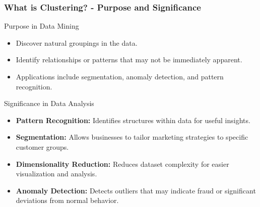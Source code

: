 \documentclass[aspectratio=169]{beamer}
\begin{document}
\begin{frame}[fragile]
    \frametitle{What is Clustering? - Purpose and Significance}
    \begin{block}{Purpose in Data Mining}
        \begin{itemize}
            \item Discover natural groupings in the data.
            \item Identify relationships or patterns that may not be immediately apparent.
            \item Applications include segmentation, anomaly detection, and pattern recognition.
        \end{itemize}
    \end{block}

    \begin{block}{Significance in Data Analysis}
        \begin{itemize}
            \item \textbf{Pattern Recognition:} Identifies structures within data for useful insights.
            \item \textbf{Segmentation:} Allows businesses to tailor marketing strategies to specific customer groups.
            \item \textbf{Dimensionality Reduction:} Reduces dataset complexity for easier visualization and analysis.
            \item \textbf{Anomaly Detection:} Detects outliers that may indicate fraud or significant deviations from normal behavior.
        \end{itemize}
    \end{block}
\end{frame}
\end{document}

